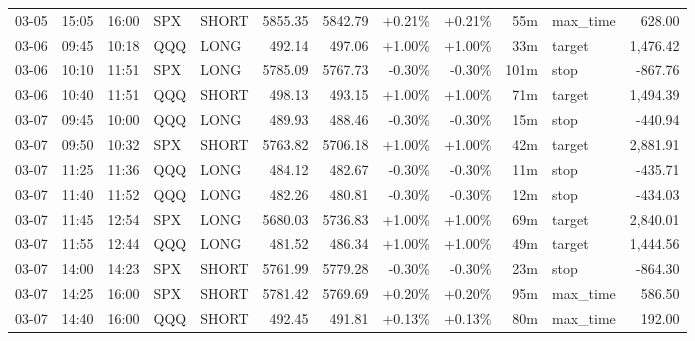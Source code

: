\documentclass[11pt,a4paper]{article}
\begin{document}
\begin{center}
\begin{longtable}{>{\color{txtmain}}l l l l l r r r r r >{\color{txtmain}}l r}
03-05 & 15:05 & 16:00 & SPX & SHORT & 5855.35 & 5842.79 & \textcolor{wingreen}{+0.21\%} & \textcolor{wingreen}{+0.21\%} & 55m & max\_time & \textcolor{wingreen}{628.00} \\
03-06 & 09:45 & 10:18 & QQQ & LONG & 492.14 & 497.06 & \textcolor{wingreen}{+1.00\%} & \textcolor{wingreen}{+1.00\%} & 33m & target & \textcolor{wingreen}{1,476.42} \\
03-06 & 10:10 & 11:51 & SPX & LONG & 5785.09 & 5767.73 & \textcolor{lossred}{-0.30\%} & \textcolor{lossred}{-0.30\%} & 101m & stop & \textcolor{lossred}{-867.76} \\
03-06 & 10:40 & 11:51 & QQQ & SHORT & 498.13 & 493.15 & \textcolor{wingreen}{+1.00\%} & \textcolor{wingreen}{+1.00\%} & 71m & target & \textcolor{wingreen}{1,494.39} \\
03-07 & 09:45 & 10:00 & QQQ & LONG & 489.93 & 488.46 & \textcolor{lossred}{-0.30\%} & \textcolor{lossred}{-0.30\%} & 15m & stop & \textcolor{lossred}{-440.94} \\
03-07 & 09:50 & 10:32 & SPX & SHORT & 5763.82 & 5706.18 & \textcolor{wingreen}{+1.00\%} & \textcolor{wingreen}{+1.00\%} & 42m & target & \textcolor{wingreen}{2,881.91} \\
03-07 & 11:25 & 11:36 & QQQ & LONG & 484.12 & 482.67 & \textcolor{lossred}{-0.30\%} & \textcolor{lossred}{-0.30\%} & 11m & stop & \textcolor{lossred}{-435.71} \\
03-07 & 11:40 & 11:52 & QQQ & LONG & 482.26 & 480.81 & \textcolor{lossred}{-0.30\%} & \textcolor{lossred}{-0.30\%} & 12m & stop & \textcolor{lossred}{-434.03} \\
03-07 & 11:45 & 12:54 & SPX & LONG & 5680.03 & 5736.83 & \textcolor{wingreen}{+1.00\%} & \textcolor{wingreen}{+1.00\%} & 69m & target & \textcolor{wingreen}{2,840.01} \\
03-07 & 11:55 & 12:44 & QQQ & LONG & 481.52 & 486.34 & \textcolor{wingreen}{+1.00\%} & \textcolor{wingreen}{+1.00\%} & 49m & target & \textcolor{wingreen}{1,444.56} \\
03-07 & 14:00 & 14:23 & SPX & SHORT & 5761.99 & 5779.28 & \textcolor{lossred}{-0.30\%} & \textcolor{lossred}{-0.30\%} & 23m & stop & \textcolor{lossred}{-864.30} \\
03-07 & 14:25 & 16:00 & SPX & SHORT & 5781.42 & 5769.69 & \textcolor{wingreen}{+0.20\%} & \textcolor{wingreen}{+0.20\%} & 95m & max\_time & \textcolor{wingreen}{586.50} \\
03-07 & 14:40 & 16:00 & QQQ & SHORT & 492.45 & 491.81 & \textcolor{wingreen}{+0.13\%} & \textcolor{wingreen}{+0.13\%} & 80m & max\_time & \textcolor{wingreen}{192.00} \\

\end{longtable}
\end{center}
\end{document}
